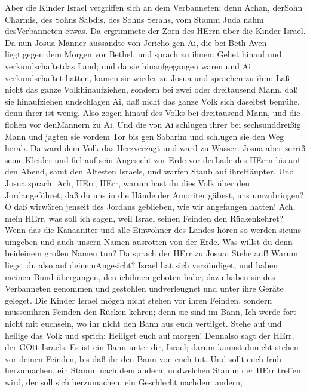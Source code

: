  Aber die Kinder Israel vergriffen sich an dem Verbanneten;
denn Achan, derSohn Charmis, des Sohns Sabdis, des Sohns Serahs, vom
Stamm Juda nahm desVerbanneten etwas. Da ergrimmete der Zorn des HErrn
über die Kinder Israel.  Da nun Josua Männer aussandte von
Jericho gen Ai, die bei Beth-Aven liegt,gegen dem Morgen vor Bethel, und
sprach zu ihnen: Gehet hinauf und verkundschaftetdas Land; und da sie
hinaufgegangen waren und Ai verkundschaftet hatten,  kamen
sie wieder zu Josua und sprachen zu ihm: Laß nicht das ganze
Volkhinaufziehen, sondern bei zwei oder dreitausend Mann, daß sie
hinaufziehen undschlagen Ai, daß nicht das ganze Volk sich daselbst
bemühe, denn ihrer ist wenig.  Also zogen hinauf des Volks
bei dreitausend Mann, und die flohen vor denMännern zu Ai. 
Und die von Ai schlugen ihrer bei sechsunddreißig Mann und jagten sie
vordem Tor bis gen Sabarim und schlugen sie den Weg herab. Da ward dem
Volk das Herzverzagt und ward zu Wasser.  Josua aber zerriß
seine Kleider und fiel auf sein Angesicht zur Erde vor derLade des HErrn
bis auf den Abend, samt den Ältesten Israels, und warfen Staub auf
ihreHäupter.  Und Josua sprach: Ach, HErr, HErr, warum hast
du dies Volk über den Jordangeführet, daß du uns in die Hände der
Amoriter gäbest, uns umzubringen? O daß wirwären jenseit des Jordans
geblieben, wie wir angefangen hatten!  Ach, mein HErr, was
soll ich sagen, weil Israel seinen Feinden den Rückenkehret?
 Wenn das die Kanaaniter und alle Einwohner des Landes hören
so werden sieuns umgeben und auch unsern Namen ausrotten von der Erde.
Was willst du denn beideinem großen Namen tun?  Da sprach
der HErr zu Josua: Stehe auf! Warum liegst du also auf deinemAngesicht?
 Israel hat sich versündiget, und haben meinen Bund
übergangen, den ichihnen geboten habe; dazu haben sie des Verbanneten
genommen und gestohlen undverleugnet und unter ihre Geräte geleget.
 Die Kinder Israel mögen nicht stehen vor ihren Feinden,
sondern müssenihren Feinden den Rücken kehren; denn sie sind im Bann,
Ich werde fort nicht mit euchsein, wo ihr nicht den Bann aus euch
vertilget.  Stehe auf und heilige das Volk und sprich:
Heiliget euch auf morgen! Dennalso sagt der HErr, der GOtt Israels: Es
ist ein Bann unter dir, Israel; darum kannst dunicht stehen vor deinen
Feinden, bis daß ihr den Bann von euch tut.  Und sollt euch
früh herzumachen, ein Stamm nach dem andern; undwelchen Stamm der HErr
treffen wird, der soll sich herzumachen, ein Geschlecht nachdem andern;
